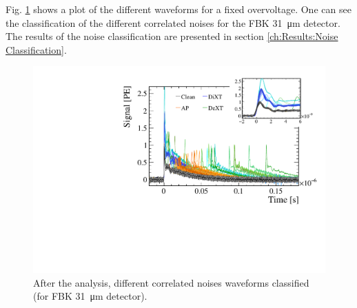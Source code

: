 Fig. \ref{fig: mix waveforms and thresholds} shows a plot of the different waveforms for a fixed overvoltage. One can see the classification of the different correlated noises for the FBK \SI{31}{\micro m} detector. 
The results of the noise classification are presented in section \ref{ch:Results:Noise Classification}.

\begin{figure}[htbp]
  \centering
    \includegraphics[width=\textwidth]{gfx/plots/WA/31/mix.pdf}
    \caption{After the analysis, different correlated noises waveforms classified (for FBK \SI{31}{\micro m} detector).}
     \label{fig: mix waveforms and thresholds}
\end{figure}









